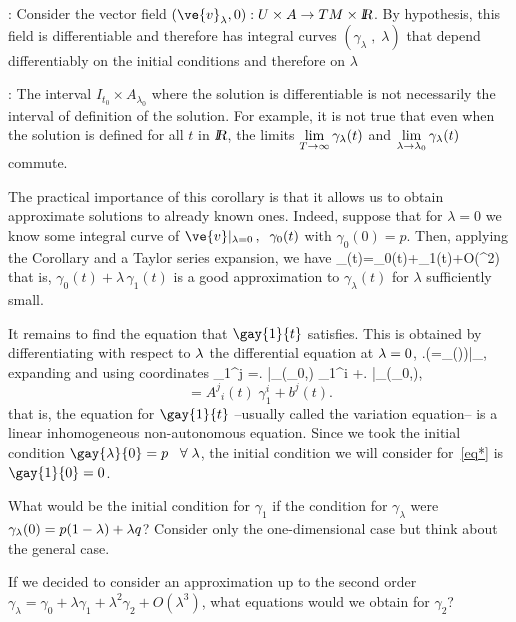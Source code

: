 \pru: Consider the vector field $(\ve{v}_{\lambda},0):U\times
A \to TM\times \re$. By hypothesis, this field is differentiable and therefore
has integral curves $(\gamma_{\lambda}\;,\; \lambda)$ that
depend differentiably on the initial conditions and therefore on $\lambda$ 
\epru

\espa
\noi{}: The interval $I_{t_0}\times A_{\lambda_0}$ where
the solution is differentiable is not necessarily the interval of
definition of the solution. For example, it is not true that even
when the solution is defined for all $t$ in $\mbox{\sl {l$\!\!\!\;\:\!$R}}$, the limits $\displaystyle \lim_{T\to \infty}\gamma_{\lambda}(t)$ and $ \displaystyle
\lim_{\lambda \to \lambda_0}\gamma_{\lambda}(t) $ commute.

The practical importance of this corollary is that it allows us to
obtain approximate solutions to already known ones. Indeed,
suppose that for $\lambda=0$ we know some integral curve of
$\ve{v}|_{\lambda=0}\,,\;\;\gamma_0(t)$ with $\gamma_0(0)=p$. Then,
applying the Corollary and a Taylor series expansion, we have 
 \beq 
 \gamma_{\lambda}(t)=\gamma_0(t)+\lambda\;\gamma_1(t)+O(\lambda^2)
 \eeq
 \noi that is, $\gamma_0(t)+\lambda\,\gamma_1(t)$ is a good
approximation to $\gamma_{\lambda}(t) $ for $ \lambda$ sufficiently
small.

It remains to find the equation that $\gay{1}{t}$ satisfies.
This is obtained by differentiating with respect to $\mbox{$\lambda$}$ the differential
equation at $\mbox{$\lambda$} =0$,
\beq
\der{\lambda}\left.\left(=_{\lambda}()\right)\right|_{},
\eeq
expanding and using coordinates
\beq
{}\gamma_1^j =\left.  \right|_{(\gamma_0,)}\cdot
\gamma_1^i +\left. \right|_{(\gamma_0,)},
\eeq
$$
=A^j{}_{i}(t)\;\gamma_1^i +b^j(t).   \label{eq*}
$$
\noi that is, the equation for $\gay{1}{t}$ --usually called the variation equation-- is a linear inhomogeneous non-autonomous equation. Since
we took the initial condition $\gay{\lambda}{0}=p\;\;\;\forall\;\lam$, 
the initial condition we will consider for~\ref{eq*} is $\gay{1}{0}=0$.
\espa



\bpro 
What would be the initial condition for $\gamma_1$ if the
condition for $\gamma_{\lambda}$ were 
$ \gamma_{\lambda}(0)=p(1-\mbox{$\lambda$})+\mbox{$\lambda$} q$? 
Consider only the one-dimensional case but think about the general case. 
\epro

\bpro
If we decided to consider an approximation up to the second
order $\gamma_{\lambda}=\gamma_0 +\lambda\gamma_1+\lambda^2\gamma_2+O(\lambda^3)$, what
equations would we obtain for $\gamma_2$?
\epro

